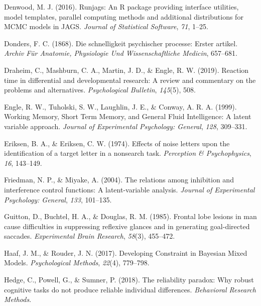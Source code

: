 \documentclass[
  ,man,floatsintext]{apa6}
\newlength{\cslhangindent}
\newlength{\cslentryspacingunit} %
\newenvironment{CSLReferences}[2] %
 {%
  \setlength{\parindent}{0pt}
  \ifodd #1
  \let\oldpar\par
  \def\par{\hangindent=\cslhangindent\oldpar}
  \fi
  \setlength{\parskip}{#2\cslentryspacingunit}
 }%
 {}
\begin{document}
\begin{CSLReferences}{1}{0}
\leavevmode{}%
Denwood, M. J. (2016). Runjags: {An R} package providing interface utilities, model templates, parallel computing methods and additional distributions for {MCMC} models in {JAGS}. \emph{Journal of Statistical Software}, \emph{71}, 1--25.

\leavevmode{}%
Donders, F. C. (1868). Die schnelligkeit psychischer processe: {Erster} artikel. \emph{Archiv Für Anatomie, Physiologie Und Wissenschaftliche Medicin}, 657--681.

\leavevmode{}%
Draheim, C., Mashburn, C. A., Martin, J. D., \& Engle, R. W. (2019). Reaction time in differential and developmental research: {A} review and commentary on the problems and alternatives. \emph{Psychological Bulletin}, \emph{145}(5), 508.

\leavevmode{}%
Engle, R. W., Tuholski, S. W., Laughlin, J. E., \& Conway, A. R. A. (1999). Working {Memory}, {Short Term Memory}, and {General Fluid Intelligence}: {A} latent variable approach. \emph{Journal of Experimental Psychology: General}, \emph{128}, 309--331.

\leavevmode{}%
Eriksen, B. A., \& Eriksen, C. W. (1974). Effects of noise letters upon the identification of a target letter in a nonsearch task. \emph{Perception \& Psychophysics}, \emph{16}, 143--149.

\leavevmode{}%
Friedman, N. P., \& Miyake, A. (2004). The relations among inhibition and interference control functions: {A} latent-variable analysis. \emph{Journal of Experimental Psychology: General}, \emph{133}, 101--135.

\leavevmode{}%
Guitton, D., Buchtel, H. A., \& Douglas, R. M. (1985). Frontal lobe lesions in man cause difficulties in suppressing reflexive glances and in generating goal-directed saccades. \emph{Experimental Brain Research}, \emph{58}(3), 455--472.

\leavevmode{}%
Haaf, J. M., \& Rouder, J. N. (2017). Developing {Constraint} in {Bayesian Mixed Models}. \emph{Psychological Methods}, \emph{22}(4), 779--798.

\leavevmode{}%
Hedge, C., Powell, G., \& Sumner, P. (2018). The reliability paradox: {Why} robust cognitive tasks do not produce reliable individual differences. \emph{Behavioral Research Methods}.


\end{CSLReferences}
\end{document}
